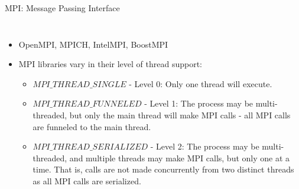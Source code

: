 \documentclass[10pt,times]{beamer}
\begin{document}
\begin{frame}{MPI: Message Passing Interface}
\begin{columns}
\begin{itemize}
\item OpenMPI, MPICH, IntelMPI, BoostMPI
\item MPI libraries vary in their level of thread support:
\begin{itemize}
\item $MPI\_THREAD\_SINGLE$ - Level 0: Only one thread will execute.

\item $MPI\_THREAD\_FUNNELED$ - Level 1: The process may be multi-threaded, but 
only the main thread will make MPI calls - all MPI calls are funneled to the main 
thread.

\item $MPI\_THREAD\_SERIALIZED$ - Level 2: The process may be multi-threaded, and 
multiple threads may make MPI calls, but only one at a time. That is, calls are not 
made concurrently from two distinct threads as all MPI calls are serialized.


\end{itemize}
\end{itemize}
\end{columns}
\end{frame}
\end{document}
